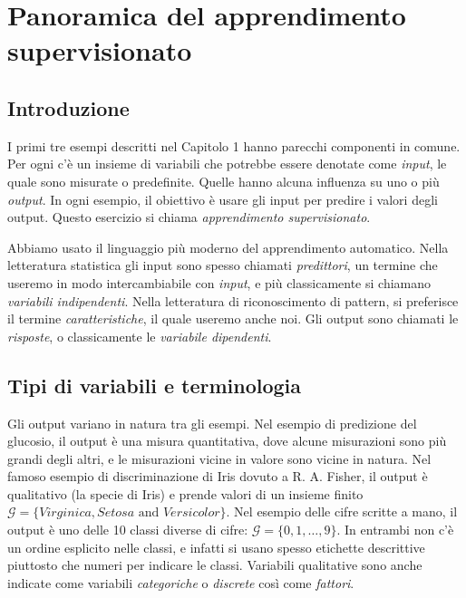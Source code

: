 \documentclass[11pt,openany]{book}
\begin{document}
\tableofcontents

\chapter{Panoramica del apprendimento supervisionato}

\section{Introduzione}

I primi tre esempi descritti nel Capitolo 1 hanno parecchi componenti in comune. Per ogni c'è un insieme di variabili che potrebbe essere denotate come {\it input}, le quale sono misurate o predefinite. Quelle hanno alcuna influenza su uno o più {\it output}. In ogni esempio, il obiettivo è usare gli input per predire i valori degli output. Questo esercizio si chiama {\it apprendimento supervisionato}.

Abbiamo usato il linguaggio più moderno del apprendimento automatico. Nella letteratura statistica gli input sono spesso chiamati {\it predittori}, un termine che useremo in modo intercambiabile con {\it input}, e più classicamente si chiamano {\it variabili indipendenti}. Nella letteratura di riconoscimento di pattern, si preferisce il termine {\it caratteristiche}, il quale useremo anche noi. Gli output sono chiamati le {\it risposte}, o classicamente le {\it variabile dipendenti}.

\section{Tipi di variabili e terminologia}

Gli output variano in natura tra gli esempi. Nel esempio di predizione del glucosio, il output è una misura quantitativa, dove alcune misurazioni sono più grandi degli altri, e le misurazioni vicine in valore sono vicine in natura. Nel famoso esempio di discriminazione di Iris dovuto a R. A. Fisher, il output è qualitativo (la specie di Iris) e prende valori di un insieme finito $\mathcal{G} = \{ Virginica, Setosa \text{ and } Versicolor \}$. Nel esempio delle cifre scritte a mano, il output è uno delle 10 classi diverse di cifre: $\mathcal{G} = \{0, 1, \dots, 9\}$. In entrambi non c'è un ordine esplicito nelle classi, e infatti si usano spesso etichette descrittive piuttosto che numeri per indicare le classi. Variabili qualitative sono anche indicate come variabili {\it categoriche} o {\it discrete} così come {\it fattori}.
\end{document}
